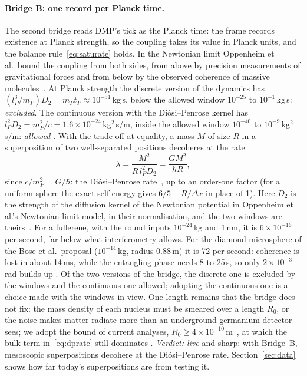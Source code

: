 \paragraph{Bridge B: one record per Planck time.} The second bridge reads DMP's tick as the Planck time: the frame records existence at
Planck strength, so the coupling takes its value in Planck units, and the balance rule~\eqref{eq:saturate} holds. In the Newtonian limit
Oppenheim et al.\ bound the coupling from both sides, from above by precision measurements of gravitational forces and from below by the
observed coherence of massive molecules~\cite{osswd}. At Planck strength the discrete version of the dynamics has
$(l_P^3/m_P)D_2=m_Pt_P\approx10^{-51}$\,kg\,s, below the allowed window $10^{-25}$ to $10^{-1}$\,kg\,s: \emph{excluded}. The continuous
version with the Di\'osi--Penrose kernel has $l_P^2D_2=m_P^2/c=1.6\times10^{-24}$\,kg$^2$\,s/m, inside the allowed window $10^{-40}$ to
$10^{-9}$\,kg$^2$\,s/m: \emph{allowed} . With the trade-off at equality, a mass $M$ of size $R$ in a superposition of two
well-separated positions decoheres at the rate
\begin{equation}\label{eq:dprate}
\lambda=\frac{M^2}{R\,l_P^2D_2}=\frac{GM^2}{\hbar R},
\end{equation}
since $c/m_P^2=G/\hbar$: the Di\'osi--Penrose rate~\cite{diosi87,penrose96}, up to an order-one factor (for a uniform sphere the
exact self-energy gives $6/5-R/\Delta x$ in place of 1). Here $D_2$ is the strength of the diffusion kernel of the Newtonian potential in
Oppenheim et al.'s Newtonian-limit model, in their normalisation, and the two windows are theirs~\cite[Eqs.~(44), (46), (47)]{osswd}. For a fullerene, with the round inputs $10^{-24}$\,kg and 1\,nm, it is $6\times10^{-16}$ per second, far below what interferometry allows. For the diamond microsphere of the Bose
et al.\ proposal ($10^{-14}$\,kg, radius 0.88\,\textmu m) it is 72 per second: coherence is lost in about 14\,ms, while the entangling phase
needs 8 to 25\,s, so only $2\times10^{-3}$\,rad builds up . Of the two versions of the bridge, the discrete one is excluded by
the windows and the continuous one allowed; adopting the continuous one is a choice made with the windows in view. One length remains that
the bridge does not fix: the mass density of each nucleus must be smeared over a length $R_0$, or the noise makes matter radiate more than
an underground germanium detector sees; we adopt the bound of current analyses, $R_0\ge4\times10^{-10}$\,m~\cite{donadi,figurato}, at
which the bulk term in~\eqref{eq:dprate} still dominates . \emph{Verdict: live} and sharp: with Bridge~B, mesoscopic
superpositions decohere at the Di\'osi--Penrose rate. Section~\ref{sec:data} shows how far today's superpositions are from testing
it.

